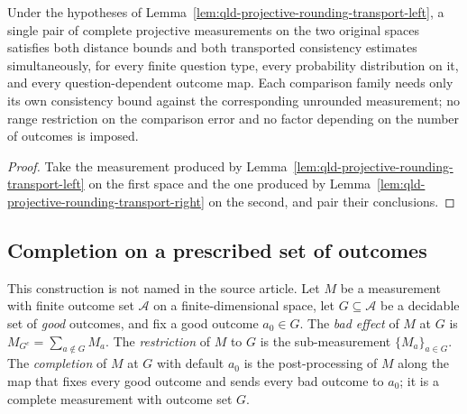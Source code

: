 	\begin{lemma}
		\label{lem:qld-projective-rounding-transport}
		\leanok
		Under the hypotheses of
		Lemma~\ref{lem:qld-projective-rounding-transport-left}, a single pair of
		complete projective measurements on the two original spaces satisfies both
		distance bounds and both transported consistency estimates simultaneously,
		for every finite question type, every probability distribution on it, and
		every question-dependent outcome map. Each comparison family needs only its
		own consistency bound against the corresponding unrounded measurement; no
		range restriction on the comparison error and no factor depending on the
		number of outcomes is imposed.
	\end{lemma}
	\begin{proof}
		\leanok
		Take the measurement produced by
		Lemma~\ref{lem:qld-projective-rounding-transport-left} on the first space
		and the one produced by
		Lemma~\ref{lem:qld-projective-rounding-transport-right} on the second, and
		pair their conclusions.
	\end{proof}

	\subsection{Completion on a prescribed set of outcomes}


	\begin{definition}
		\label{def:supported-completion}
		\leanok
		This construction is not named in the source article. Let $M$ be a
		measurement with finite outcome set $\mathcal A$ on a finite-dimensional
		space, let $G \subseteq \mathcal A$ be a decidable set of \emph{good}
		outcomes, and fix a good outcome $a_0 \in G$. The \emph{bad effect} of
		$M$ at $G$ is $M_{G^c} = \sum_{a \notin G} M_a$. The \emph{restriction}
		of $M$ to $G$ is the sub-measurement $\{M_a\}_{a \in G}$. The
		\emph{completion} of $M$ at $G$ with default $a_0$ is the post-processing
		of $M$ along the map that fixes every good outcome and sends every bad
		outcome to $a_0$; it is a complete measurement with outcome set $G$.
	\end{definition}

